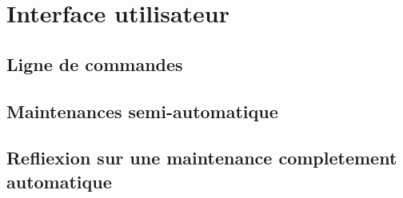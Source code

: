 
\chapter{Interface utilisateur}

\section{Ligne de commandes}

\section{Maintenances semi-automatique}

\section{Refliexion sur une maintenance completement automatique}

